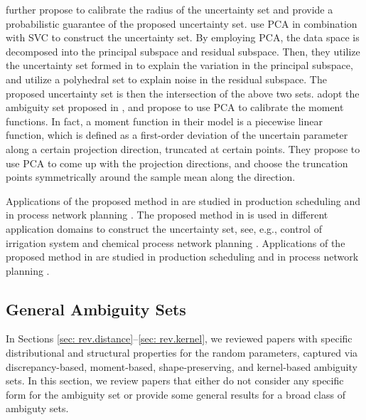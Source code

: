 \documentclass[final,onefignum,onetabnum]{class}
\begin{document}
\citet{shang2018predictive} further propose to calibrate the radius of the uncertainty set  and provide a probabilistic guarantee of the proposed uncertainty set. 
\citet{shang2018SVC}  use PCA in combination with SVC to construct the uncertainty set. By employing PCA, the data space is decomposed into the principal subspace and residual subspace. Then, they utilize  the uncertainty set formed in \citet{shang2017} to explain the variation in the principal subspace, and  utilize a polyhedral set to explain noise in the residual subspace. The proposed uncertainty set is then the intersection of the above two sets. 
\citet{shang2018dDROscheduling} adopt the ambiguity set proposed in \citet{wiesemann2014}, and propose to use PCA to calibrate the moment functions. In fact, a moment function in their model is a piecewise linear function, which  is defined as a  first-order deviation of the uncertain parameter along a certain projection direction, truncated at certain points. They propose to use PCA to come up with the projection directions, and  choose the truncation points symmetrically around the sample mean along the direction. 



Applications of the proposed method in \citet{ning2018kernel} are studied in  production scheduling \citep{ning2018kernel} and in process network planning \citep{ning2018kernel,ning2018hedging,ning2018PCA}. 
The proposed method in \citet{shang2017} is used in different application domains to construct the uncertainty set, see, e.g., control of irrigation system \citep{shang2018robust} and chemical process network planning \citep{shang2017}.   
Applications of the proposed method in \citet{shang2018dDROscheduling} are studied in  production scheduling \citep{shang2018dDROscheduling,shang2018process} and in process network planning \citep{shang2018dDROscheduling,shang2018DRO}. 




\subsection{General Ambiguity Sets}	
\label{sec: rev.general}

In Sections \ref{sec: rev.distance}--\ref{sec: rev.kernel}, we reviewed papers with specific distributional and structural properties for the random parameters, captured  via discrepancy-based, moment-based,  shape-preserving, and kernel-based ambiguity sets. In this section, we review papers that either do not consider any specific form for the ambiguity set or  provide some  general results for a broad class of ambiguty sets. 
\end{document}
